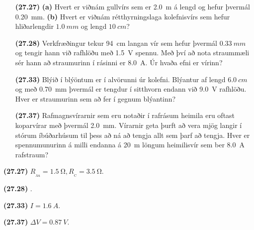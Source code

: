 \begin{enumerate}[label = \textbf{(\alph*)}]

\item[\textbf{(27.27)}] \textbf{(a)} Hvert er viðnám gullvírs sem er \SI{2.0}{m} á lengd og hefur þvermál \SI{0.20}{mm}. \textbf{(b)} Hvert er viðnám rétthyrningslaga kolefnisvírs sem hefur hliðarlengdir $\SI{1.0}{mm}$ og lengd $\SI{10}{cm}$? 

\item[\textbf{(27.28)}] Verkfræðingur tekur \SI{94}{cm} langan vír sem hefur þvermál $\SI{0.33}{mm}$ og tengir hann við rafhlöðu með \SI{1.5}{V} spennu. Með því að nota straummæli sér hann að straumurinn í rásinni er \SI{8.0}{A}. Úr hvaða efni er vírinn?

\item[\textbf{(27.33)}] Blýið í blýöntum er í alvörunni úr kolefni. Blýantur af lengd $\SI{6.0}{cm}$ og með \SI{0.70}{mm} þvermál er tengdur í sitthvorn endann við \SI{9.0}{V} rafhlöðu. Hver er straumurinn sem að fer í gegnum blýantinn?

\item[\textbf{(27.37)}] Rafmagnsvírarnir sem eru notaðir í rafrásum heimila eru oftast koparvírar með þvermál \SI{2.0}{mm}. Vírarnir geta þurft að vera mjög langir í stórum íbúðarhúsum til þess að ná að tengja allt sem þarf að tengja. Hver er spennumunurinn á milli endanna á \SI{20}{m} löngum heimilisvír sem ber \SI{8.0}{A} rafstraum?

\end{enumerate}

\begin{tcolorbox}
\begin{enumerate*}[label = \vspace{0.1cm}]
  \item \textbf{(27.27)} $R_{\!_{\text{Au}}} = \SI{1.5}{\ohm}, R_{\!_{\text{C}}} = \SI{3.5}{\ohm}$.
  \item \textbf{(27.28)} .
  \item \textbf{(27.33)} $I = \SI{1.6}{A}$.
  \item \textbf{(27.37)} $\Delta V = \SI{0.87}{V}$.
\end{enumerate*}
\end{tcolorbox}

\newpage